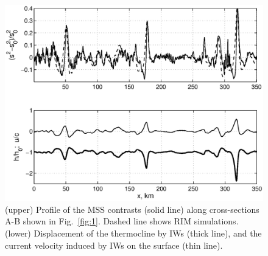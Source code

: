 \documentclass[draft,grl]{agutex}
\begin{document}
\begin{figure}
\noindent\includegraphics[width=\linewidth]{fig2.eps}
\caption{(upper) Profile of the MSS contrasts (solid line) along cross-sections A-B shown in Fig.~\ref{fig:1}. Dashed line shows RIM simulations. (lower) Displacement of the thermocline by IWs (thick line), and the current velocity induced by IWs on the surface (thin line).}
\label{fig:2}
\end{figure}
\end{document}
